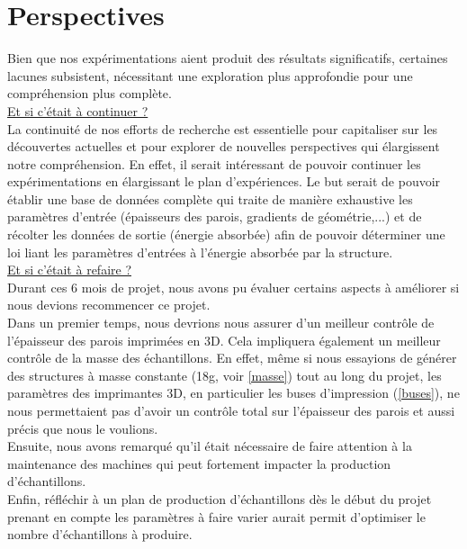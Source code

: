 \documentclass[a4paper]{article}
\begin{document}
	\section{Perspectives}
	
	\hspace{0.5cm}Bien que nos expérimentations aient produit des résultats significatifs, certaines lacunes subsistent, nécessitant une exploration plus approfondie pour une compréhension plus complète.\\
	
	\underline{Et si c'était à continuer ?}\\
	
	La continuité de nos efforts de recherche est essentielle pour capitaliser sur les découvertes actuelles et pour explorer de nouvelles perspectives qui élargissent notre compréhension. En effet, il serait intéressant de pouvoir continuer les expérimentations en élargissant le plan d'expériences. Le but serait de pouvoir établir une base de données complète qui traite de manière exhaustive les paramètres d'entrée (épaisseurs des parois, gradients de géométrie,...) et de récolter les données de sortie (énergie absorbée) afin de pouvoir déterminer une loi liant les paramètres d'entrées à l'énergie absorbée par la structure. \\
	
	\underline{Et si c'était à refaire ?}\\
	
	Durant ces 6 mois de projet, nous avons pu évaluer certains aspects à améliorer si nous devions recommencer ce projet.\\
	
	Dans un premier temps, nous devrions nous assurer d'un meilleur contrôle de l’épaisseur des parois imprimées en 3D. Cela impliquera également un meilleur contrôle de la masse des échantillons. En effet, même si nous essayions de générer des structures à masse constante (18g, voir \ref{masse}) tout au long du projet, les paramètres des imprimantes 3D, en particulier les buses d'impression (\ref{buses}), ne nous permettaient pas d'avoir un contrôle total sur l'épaisseur des parois et aussi précis que nous le voulions.\\
	
	Ensuite, nous avons remarqué qu'il était nécessaire de faire attention à la maintenance des machines qui peut fortement
	impacter la production d’échantillons.\\
	
	Enfin, réfléchir à un plan de production d’échantillons dès le début du projet prenant en compte les paramètres à faire varier aurait permit d’optimiser le nombre d’échantillons à produire.\\
	
\end{document}
